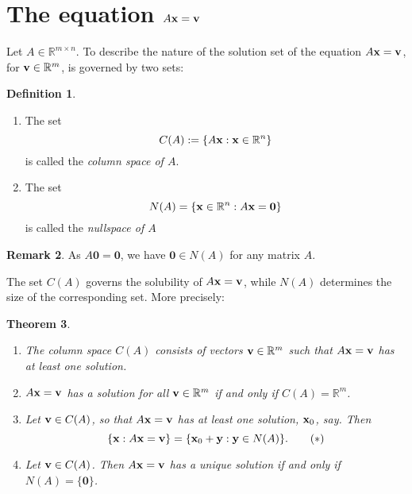 \documentclass[12pt]{amsart}
\newcommand{\RR}{\mathbb{R}} \DeclareMathOperator{\rref}{rref}
\newtheorem{theorem}{Theorem}[section]
\theoremstyle{definition} \newtheorem{definition}[theorem]{Definition}
\newtheorem{remark}[theorem]{Remark} \newtheorem{remarks}[theorem]{Remarks}
\newcommand{\by}{\mathbf{y}} \newcommand{\bz}{\mathbf{z}}
\newcommand{\bzero}{\mathbf{0}}
\newcommand{\setstuff}{\setlength{\parskip}{0.5em}\setlength{\parindent}{0em}\setlength{\itemsep}{0.5em}}
\begin{document}
\setstuff

\section{The equation $A\mathbf{x}=\mathbf{v}$}

Let $A\in\RR^{m\times n}$.
To describe the nature of the solution set of the equation $A\mathbf{x}=\mathbf{v}$, for $\bv\in\RR^m$, is governed by two sets:

\begin{definition}\label{df:col_space}\hfill
  \begin{enumerate}\setstuff
   \item The set
    \[ C(A) := \{A\bx :	\bx\in\RR^n\} \]
    is called the \emph{column space of $A$}.
    \item The set
    \[ N(A) = \{\bx\in\RR^n : A\bx=\bzero\} \]
      is called the \emph{nullspace of $A$}
  \end{enumerate}
\end{definition}

\begin{remark}\label{rk:zero_in_nullspace}
  As $A\bzero=\bzero$, we have $\bzero\in N(A)$ for any matrix $A$.
\end{remark}

The set $C(A)$ governs the solubility of $A\mathbf{x}=\mathbf{v}$, while $N(A)$ determines the size of the corresponding set. More precisely:

\begin{theorem}\hfill
  \begin{enumerate}\setstuff
    \item The column space $C(A)$ consists of vectors $\bv\in\RR^m$ such that $A\mathbf{x}=\mathbf{v}$ has \emph{at least one} solution.
    \item $A\mathbf{x}=\mathbf{v}$ has a solution for all $\bv\in\RR^m$ if and only if $C(A)=\RR^m$.
    \item Let $\mathbf{v}\in C(A)$, so that $A\mathbf{x}=\mathbf{v}$ has at least one solution, $\mathbf{x}_0$, say. Then
      \begin{equation*}
        \{\bx : A\bx=\bv\} = \{\bx_0 + \by : \by\in N(A)\}.\tag{$*$}
  \end{equation*}
\item Let $\mathbf{v}\in C(A)$. Then $A\mathbf{x}=\mathbf{v}$ has a unique solution if and only if $N(A)=\{\bzero\}$.
  \end{enumerate}
\end{theorem}
\end{document}
